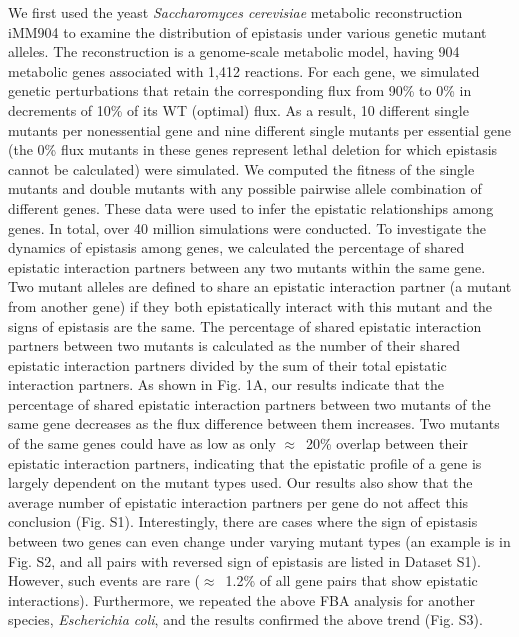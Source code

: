 We first used the yeast \textit{Saccharomyces cerevisiae} metabolic
reconstruction iMM904 \citep{Mo2009} to examine the distribution of epistasis
under various genetic mutant alleles. The reconstruction is a
genome-scale metabolic model, having 904 metabolic genes associated
with 1,412 reactions. For each gene, we simulated genetic
perturbations that retain the corresponding flux from 90\% to 0\% in
decrements of 10\% of its WT (optimal) flux. As a result, 10 different
single mutants per nonessential gene and nine different single mutants
per essential gene (the 0\% flux mutants in these genes represent
lethal deletion for which epistasis cannot be calculated) were
simulated. We computed the fitness of the single mutants and double
mutants with any possible pairwise allele combination of different
genes. These data were used to infer the epistatic relationships among
genes. In total, over 40 million simulations were conducted.  To
investigate the dynamics of epistasis among genes, we calculated the
percentage of shared epistatic interaction partners between any two
mutants within the same gene. Two mutant alleles are defined to share
an epistatic interaction partner (a mutant from another gene) if they
both epistatically interact with this mutant and the signs of
epistasis are the same. The percentage of shared epistatic interaction
partners between two mutants is calculated as the number of their
shared epistatic interaction partners divided by the sum of their
total epistatic interaction partners. As shown in Fig. 1A, our results
indicate that the percentage of shared epistatic interaction partners
between two mutants of the same gene decreases as the flux difference
between them increases. Two mutants of the same genes could have as
low as only $\approx$~20\% overlap between their epistatic interaction
partners, indicating that the epistatic profile of a gene is largely
dependent on the mutant types used. Our results also show that the
average number of epistatic interaction partners per gene do not
affect this conclusion (Fig. S1). Interestingly, there are cases where
the sign of epistasis between two genes can even change under varying
mutant types (an example is in Fig. S2, and all pairs with reversed
sign of epistasis are listed in Dataset S1). However, such events are
rare ($\approx$~1.2\% of all gene pairs that show epistatic
interactions). Furthermore, we repeated the above FBA analysis for
another species, \textit{Escherichia coli}, and the results confirmed
the above trend (Fig. S3).


